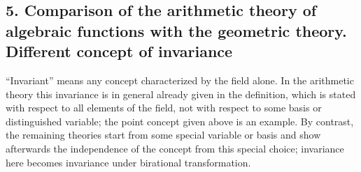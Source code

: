 \documentclass[11pt]{article}
\begin{document}
\subsection*{5. Comparison of the arithmetic theory of algebraic functions with the geometric theory. Different concept of invariance}
``Invariant'' means any concept characterized by the field alone. In the arithmetic theory this invariance is in general already given in the definition, which is stated with respect to all elements of the field, not with respect to some basis or distinguished variable; the point concept given above is an example. By contrast, the remaining theories start from some special variable or basis and show afterwards the independence of the concept from this special choice; invariance here becomes invariance under birational transformation.
\end{document}
